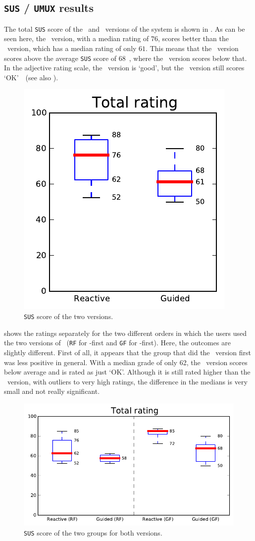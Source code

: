 \subsection{\texttt{SUS} / \texttt{UMUX} results}
The total \verb|SUS| score of the \IDa\ and \IDb\ versions of the system is shown in . As can be seen here, the \IDa\ version, with a median rating of $76$, scores better than the \IDb\ version, which has a median rating of only $61$. This means that the \IDa\ version scores above the average \verb|SUS| score of 68~\cite{sauro2011measuring}, where the \IDb\ version scores below that. In the adjective rating scale, the \IDa\ version is `good', but the \IDb\ version still scores `OK'~\cite{bangor2009determining}~(see also ).

\begin{figure}[h!]
\center
\includegraphics[width=.32\textwidth]{img/graphs/4a_10.pdf}
\caption{\texttt{SUS} score of the two versions.}
\end{figure}

 shows the ratings separately for the two different orders in which the users used the two versions of \oframp~(\verb|RF| for \IDa-first and \verb|GF| for \IDb-first). Here, the outcomes are slightly different. First of all, it appears that the group that did the \IDa\ version first was less positive in general. With a median grade of only 62, the \IDa\ version scores below average and is rated as just `OK'. Although it is still rated higher than the \IDb\ version, with outliers to very high ratings, the difference in the medians is very small and not really significant.

\begin{figure}[h!]
\center
\includegraphics[width=.6\textwidth]{img/graphs/4b_10.pdf}
\caption{\texttt{SUS} score of the two groups for both versions.}
\end{figure}

